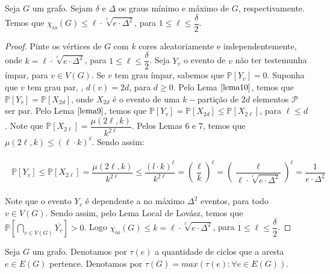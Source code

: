 \documentclass[12pt]{article}
\begin{document}
 \begin{lema}
 	\label{lema11} Seja $G$ um grafo. Sejam $\delta$ e $\Delta$ os graus mínimo e máximo de $G$, respectivamente. Temos que $\chi_{io}(G) \leq \ell {\cdot} \sqrt[\ell]{e {\cdot} \Delta^2}$, para $1 \leq \ell \leq \dfrac{\delta}{2}$.
 \end{lema}
  
  \begin{proof}
  	Pinte os vértices de $G$ com $k$ cores aleatoriamente e independentemente, onde $k = \ell {\cdot} \sqrt[\ell]{e {\cdot} \Delta^2}$, para $1 \leq \ell \leq \dfrac{\delta}{2}$. Seja $Y_{v}$ o evento de $v$ não ter testemunha ímpar, para $v \in V(G)$. Se $v$ tem grau ímpar, sabemos que $\mathds{P}[Y_v] = 0$. Suponha que $v$ tem grau par, \ie, $d(v) = 2d$, para $d \geq 0$. Pelo Lema $\ref{lema10}$, temos que $\mathds{P}[Y_v] = \mathds{P}[X_{2d}]$, onde $X_{2d}$ é o evento de uma $k-$partição de $2d$ elementos $\mathcal{P}$ ser par. Pelo Lema $\ref{lema9}$, temos que $\mathds{P}[Y_v] = \mathds{P}[X_{2d}] \leq \mathds{P}[X_{2\ell}]$, para $\ell \leq d$. Note que $\mathds{P}[X_{2\ell}] =\dfrac{\mu(2\ell, k)}{k^{2\ell}} $. Pelos Lemas $6$ e $7$, temos que $\mu(2\ell, k) \leq (\ell {\cdot} k)^\ell$. Sendo assim: 
  	
  	\begin{align}
  		\begin{split}
  			\mathds{P}[Y_{v}] \leq \mathds{P}[X_{2\ell}] = \dfrac{\mu(2\ell, k)}{k^{2\ell}} \leq  \dfrac{(l {\cdot} k)^\ell}{k^{2\ell}} = \left(\dfrac{\ell}{k}\right)^\ell = \left(\dfrac{\ell}{\ell {\cdot} \sqrt[\ell]{e {\cdot} \Delta^2}}\right)^\ell = \dfrac{1}{e {\cdot} \Delta^2}
  		\end{split} 
  	\end{align}
  	
  	Note que o evento $Y_v$ é dependente a no máximo $\Delta^2$ eventos, para todo $v \in V(G)$. Sendo assim, pelo Lema Local de Lovász, temos que $\mathds{P}[\bigcap\limits_{v \in V(G)} \overline{Y_{v}} ] > 0$. Logo $\chi_{io}(G) \leq k = \ell {\cdot} \sqrt[\ell]{e {\cdot} \Delta^2}$, para $1 \leq \ell \leq \dfrac{\delta}{2}$.
  	
  \end{proof}\newpage
  
 \begin{defi}
 	Seja $G$ um grafo. Denotamos por $\tau(e)$ a quantidade de ciclos que a aresta $e \in E(G)$ pertence. Denotamos por $\tau(G) = max(\tau(e): \forall e \in E(G))$.
 \end{defi} \newbegin
 
\end{document}

